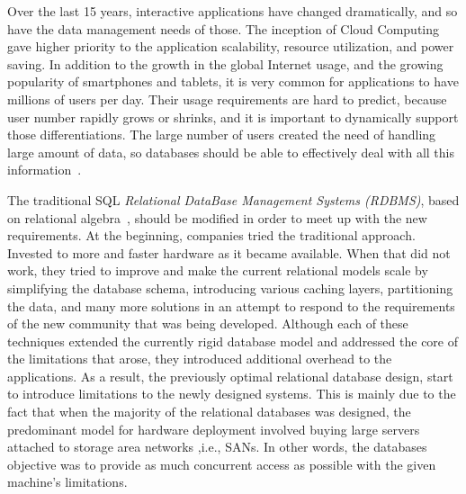 Over the last 15 years, interactive applications have changed dramatically, and
so have the data management needs of those. The inception of Cloud Computing
gave higher priority to the application scalability, resource utilization, and
power saving. In addition to the growth in the global Internet usage, and the
growing popularity of smartphones and tablets, it is very common for applications
to have millions of users per day. Their usage requirements are
hard to predict, because user number rapidly grows or shrinks, and it is important
to dynamically support those differentiations. The large number of users created
the need of handling large amount of data, so databases should be able to
effectively deal with all this information~\cite{burd}.

The traditional SQL \emph{Relational DataBase Management Systems (RDBMS)}, based
on relational algebra~,
should be modified in order to meet up with the new requirements. At the beginning,
companies tried the traditional approach. Invested to more and faster hardware
as it became available. When that did not work, they tried to improve and make the
current relational models scale by simplifying the database schema, introducing
various caching layers, partitioning the data, and many more solutions in an
attempt to respond to the requirements of the new community that was
being developed. Although
each of these techniques extended the currently rigid database model and
addressed the core of the limitations that arose, they introduced additional
overhead to the applications. As a result, the previously optimal relational
database design, start to introduce limitations to the newly designed systems.
This is mainly due to the fact that when the majority of the relational
databases was designed, the predominant model for hardware deployment involved
buying large servers attached to storage area networks ,i.e., SANs. In other
words, the databases objective was to provide as much concurrent access as
possible with the given machine's limitations.

